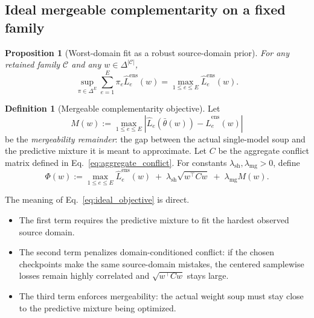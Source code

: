 \documentclass{article}
\newtheorem{proposition}[theorem]{Proposition}
\theoremstyle{definition}
\newtheorem{definition}[theorem]{Definition}
\newcommand{\cC}{\mathcal{C}}
\newcommand{\simplex}{\Delta}
\newcommand{\abs}[1]{\left\lvert #1 \right\rvert}
\newcommand{\thetaw}{\bar{\theta}(w)}
\begin{document}
\subsection{Ideal mergeable complementarity on a fixed family}

\begin{proposition}[Worst-domain fit as a robust source-domain prior]
\label{prop:worst_domain_prior}
For any retained family \(\cC\) and any \(w\in \simplex^{|\cC|}\),
\begin{equation}
\sup_{\pi\in \simplex^{E}}
\sum_{e=1}^{E} \pi_e \widehat L_e^{\mathrm{ens}}(w)
=
\max_{1\le e\le E}\widehat L_e^{\mathrm{ens}}(w).
\label{eq:worst_domain_prior}
\end{equation}
\end{proposition}

\begin{definition}[Mergeable complementarity objective]
\label{def:ideal}
Let
\begin{equation}
M(w)
:=
\max_{1\le e \le E}
\abs{
\widehat L_e(\thetaw)-\widehat L_e^{\mathrm{ens}}(w)
}
\label{eq:mergeability_remainder}
\end{equation}
be the \emph{mergeability remainder}: the gap between the actual single-model soup and the predictive mixture it is meant to approximate. Let \(C\) be the aggregate conflict matrix defined in Eq.~\eqref{eq:aggregate_conflict}. For constants \(\lambda_{\mathrm{sh}},\lambda_{\mathrm{mg}}>0\), define
\begin{equation}
\Phi(w)
:=
\max_{1\le e\le E}\widehat L_e^{\mathrm{ens}}(w)
\;+\;
\lambda_{\mathrm{sh}}\sqrt{w^\top C w}
\;+\;
\lambda_{\mathrm{mg}} M(w).
\label{eq:ideal_objective}
\end{equation}
\end{definition}

The meaning of Eq.~\eqref{eq:ideal_objective} is direct.
\begin{itemize}[leftmargin=1.3em]
    \item The first term requires the predictive mixture to fit the hardest observed source domain.
    \item The second term penalizes domain-conditioned conflict: if the chosen checkpoints make the same source-domain mistakes, the centered samplewise losses remain highly correlated and \(\sqrt{w^\top Cw}\) stays large.
    \item The third term enforces mergeability: the actual weight soup must stay close to the predictive mixture being optimized.
\end{itemize}
\end{document}
